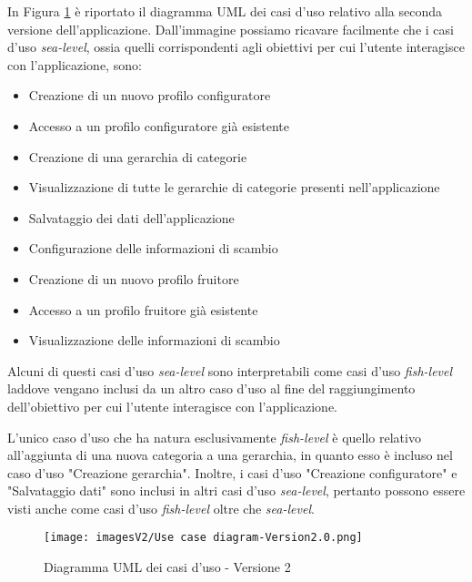 In Figura \ref{fig:Use Case 2} è riportato il diagramma UML dei casi d'uso relativo alla seconda versione dell'applicazione. Dall'immagine possiamo ricavare facilmente che i casi d'uso \textit{sea-level}, ossia quelli corrispondenti agli obiettivi per cui l'utente interagisce con l'applicazione, sono:
\begin{itemize}
    \item Creazione di un nuovo profilo configuratore 
    \item Accesso a un profilo configuratore già esistente
    \item Creazione di una gerarchia di categorie
    \item Visualizzazione di tutte le gerarchie di categorie presenti nell'applicazione
    \item Salvataggio dei dati dell'applicazione
    \item Configurazione delle informazioni di scambio
    \item Creazione di un nuovo profilo fruitore
    \item Accesso a un profilo fruitore già esistente
    \item Visualizzazione delle informazioni di scambio
\end{itemize}
Alcuni di questi casi d'uso \textit{sea-level} sono interpretabili come casi d'uso \textit{fish-level} laddove vengano inclusi da un altro caso d'uso al fine del raggiungimento dell'obiettivo per cui l'utente interagisce con l'applicazione.

L'unico caso d'uso che ha natura esclusivamente \textit{fish-level} è quello relativo all'aggiunta di una nuova categoria a una gerarchia, in quanto esso è incluso nel caso d'uso "Creazione gerarchia". Inoltre, i casi d'uso "Creazione configuratore" e "Salvataggio dati" sono inclusi in altri casi d'uso \textit{sea-level}, pertanto possono essere visti anche come casi d'uso \textit{fish-level} oltre che \textit{sea-level}.

\begin{figure}
\centering
\texttt{[image: imagesV2/Use case diagram-Version2.0.png]}
\caption{\label{fig:Use Case 2}Diagramma UML dei casi d'uso - Versione 2}
\end{figure}\bigskip